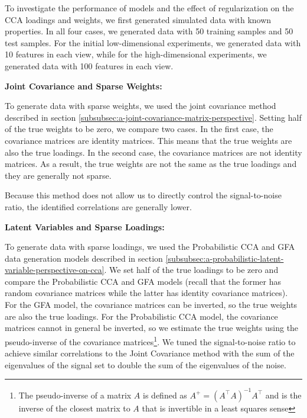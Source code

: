 To investigate the performance of models and the effect of regularization on the CCA loadings and weights, we first generated simulated data with known properties.
In all four cases, we generated data with 50 training samples and 50 test samples.
For the initial low-dimensional experiments, we generated data with 10 features in each view, while for the high-dimensional experiments, we generated data with 100 features in each view.

\textbf{Joint Covariance and Sparse Weights:}

To generate data with sparse weights, we used the joint covariance method described in section \ref{subsubsec:a-joint-covariance-matrix-perspective}.
Setting half of the true weights to be zero, we compare two cases.
In the first case, the covariance matrices are identity matrices.
This means that the true weights are also the true loadings.
In the second case, the covariance matrices are not identity matrices.
As a result, the true weights are not the same as the true loadings and they are generally not sparse.

Because this method does not allow us to directly control the signal-to-noise ratio, the identified correlations are generally lower.

\textbf{Latent Variables and Sparse Loadings:}

To generate data with sparse loadings, we used the Probabilistic CCA and GFA data generation models described in section \ref{subsubsec:a-probabilistic-latent-variable-perspective-on-cca}.
We set half of the true loadings to be zero and compare the Probabilistic CCA and GFA models (recall that the former has random covariance matrices while the latter has identity covariance matrices).
For the GFA model, the covariance matrices can be inverted, so the true weights are also the true loadings.
For the Probabilistic CCA model, the covariance matrices cannot in general be inverted, so we estimate the true weights using the pseudo-inverse of the covariance matrices\footnote{The pseudo-inverse of a matrix $A$ is defined as $A^+ = (A^\top A)^{-1} A^\top$ and is the inverse of the closest matrix to $A$ that is invertible in a least squares sense}.
We tuned the signal-to-noise ratio to achieve similar correlations to the Joint Covariance method with the sum of the eigenvalues of the signal set to double the sum of the eigenvalues of the noise.


